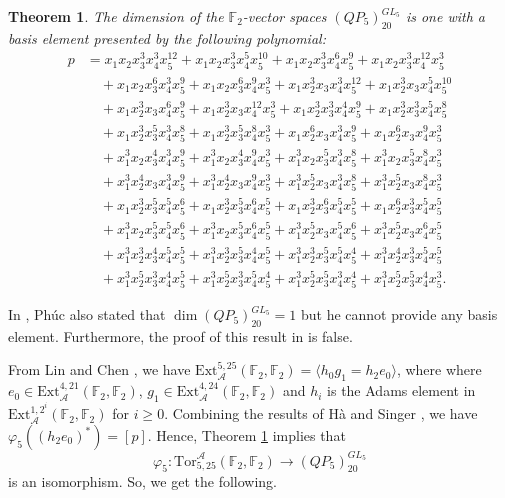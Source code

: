 \documentclass[reqno]{amsart}
\theoremstyle{plain}
\newtheorem{thm}{Theorem}[section]
\theoremstyle{definition}
\theoremstyle{plain}
\theoremstyle{definition}
\numberwithin{equation}{section}
\begin{document}
\begin{thm}\label{thm1} 
The dimension of the $\mathbb F_2$-vector spaces $(QP_5)_{20}^{GL_5}$ is one with a basis element presented by the following polynomial: 
\begin{align*}
p &= x_1x_2x_3^{3}x_4^{3}x_5^{12} + x_1x_2x_3^{3}x_4^{5}x_5^{10} + x_1x_2x_3^{3}x_4^{6}x_5^{9} + x_1x_2x_3^{3}x_4^{12}x_5^{3}\\ 
&\quad + x_1x_2x_3^{6}x_4^{3}x_5^{9} + x_1x_2x_3^{6}x_4^{9}x_5^{3} + x_1x_2^{3}x_3x_4^{3}x_5^{12} + x_1x_2^{3}x_3x_4^{5}x_5^{10}\\ 
&\quad + x_1x_2^{3}x_3x_4^{6}x_5^{9} + x_1x_2^{3}x_3x_4^{12}x_5^{3} + x_1x_2^{3}x_3^{3}x_4^{4}x_5^{9} + x_1x_2^{3}x_3^{3}x_4^{5}x_5^{8}\\ 
&\quad + x_1x_2^{3}x_3^{5}x_4^{3}x_5^{8} + x_1x_2^{3}x_3^{5}x_4^{8}x_5^{3} + x_1x_2^{6}x_3x_4^{3}x_5^{9} + x_1x_2^{6}x_3x_4^{9}x_5^{3}\\ 
&\quad + x_1^{3}x_2x_3^{4}x_4^{3}x_5^{9} + x_1^{3}x_2x_3^{4}x_4^{9}x_5^{3} + x_1^{3}x_2x_3^{5}x_4^{3}x_5^{8} + x_1^{3}x_2x_3^{5}x_4^{8}x_5^{3}\\ 
&\quad + x_1^{3}x_2^{4}x_3x_4^{3}x_5^{9} + x_1^{3}x_2^{4}x_3x_4^{9}x_5^{3} + x_1^{3}x_2^{5}x_3x_4^{3}x_5^{8} + x_1^{3}x_2^{5}x_3x_4^{8}x_5^{3}\\ 
&\quad + x_1x_2^{3}x_3^{5}x_4^{5}x_5^{6} + x_1x_2^{3}x_3^{5}x_4^{6}x_5^{5} + x_1x_2^{3}x_3^{6}x_4^{5}x_5^{5} + x_1x_2^{6}x_3^{3}x_4^{5}x_5^{5}\\ 
&\quad + x_1^{3}x_2x_3^{5}x_4^{5}x_5^{6} + x_1^{3}x_2x_3^{5}x_4^{6}x_5^{5} + x_1^{3}x_2^{5}x_3x_4^{5}x_5^{6} + x_1^{3}x_2^{5}x_3x_4^{6}x_5^{5}\\ 
&\quad + x_1^{3}x_2^{3}x_3^{4}x_4^{5}x_5^{5} + x_1^{3}x_2^{3}x_3^{5}x_4^{4}x_5^{5} + x_1^{3}x_2^{3}x_3^{5}x_4^{5}x_5^{4} + x_1^{3}x_2^{4}x_3^{3}x_4^{5}x_5^{5}\\ 
&\quad + x_1^{3}x_2^{5}x_3^{3}x_4^{4}x_5^{5} + x_1^{3}x_2^{5}x_3^{3}x_4^{5}x_5^{4} + x_1^{3}x_2^{5}x_3^{5}x_4^{3}x_5^{4} + x_1^{3}x_2^{5}x_3^{5}x_4^{4}x_5^{3}. 
\end{align*}
\end{thm}
In \cite{p24}, Ph\'uc also stated that $\dim(QP_5)_{20}^{GL_5} = 1$ but he cannot provide any basis element. Furthermore, the proof of this result in \cite{p24} is false.

From Lin \cite{wl} and Chen \cite{che}, we have $\mbox{Ext}_{\mathcal A}^{5, 25}(\mathbb F_2, \mathbb F_2) = \langle h_0g_1 = h_2e_0 \rangle$, where where $e_{0} \in \mbox{Ext}_{\mathcal A}^{4,21}(\mathbb F_2, \mathbb F_2)$, $g_1 \in \mbox{Ext}_{\mathcal A}^{4,24}(\mathbb F_2, \mathbb F_2)$ and $h_{i}$ is the Adams element in $\mbox{Ext}_{\mathcal A}^{1,2^{i}}(\mathbb F_2, \mathbb F_2)$ for $i\geqslant 0$. Combining the results of  H\`a \cite{ha} and Singer \cite{si1}, we have $\varphi_5((h_{2}e_{0})^*) = [p]$.  Hence, Theorem \ref{thm1} implies that 
$$\varphi_5: \mbox{Tor}_{5,25}^{\mathcal A}(\mathbb F_2,\mathbb F_2) \longrightarrow (QP_5)_{20}^{GL_5}$$
is an isomorphism. So, we get the following.
\end{document}
